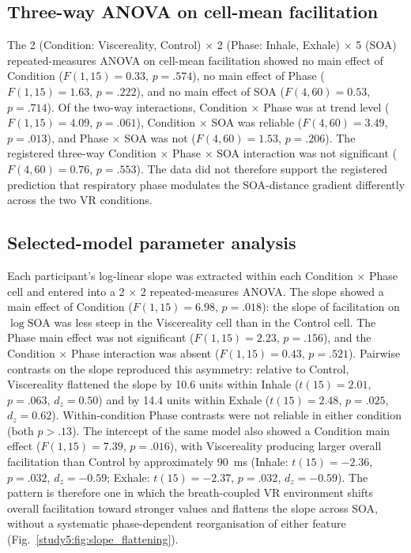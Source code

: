 \subsection{Three-way ANOVA on cell-mean facilitation}

The 2 (Condition: Viscereality, Control) $\times$ 2 (Phase: Inhale, Exhale) $\times$ 5 (SOA) repeated-measures ANOVA on cell-mean facilitation showed no main effect of Condition ($F(1,15) = 0.33$, $p = .574$), no main effect of Phase ($F(1,15) = 1.63$, $p = .222$), and no main effect of SOA ($F(4,60) = 0.53$, $p = .714$). Of the two-way interactions, Condition $\times$ Phase was at trend level ($F(1,15) = 4.09$, $p = .061$), Condition $\times$ SOA was reliable ($F(4,60) = 3.49$, $p = .013$), and Phase $\times$ SOA was not ($F(4,60) = 1.53$, $p = .206$). The registered three-way Condition $\times$ Phase $\times$ SOA interaction was not significant ($F(4,60) = 0.76$, $p = .553$). The data did not therefore support the registered prediction that respiratory phase modulates the SOA-distance gradient differently across the two VR conditions.

\subsection{Selected-model parameter analysis}

Each participant's log-linear slope was extracted within each Condition $\times$ Phase cell and entered into a 2 $\times$ 2 repeated-measures ANOVA. The slope showed a main effect of Condition ($F(1,15) = 6.98$, $p = .018$): the slope of facilitation on $\log\mathrm{SOA}$ was less steep in the Viscereality cell than in the Control cell. The Phase main effect was not significant ($F(1,15) = 2.23$, $p = .156$), and the Condition $\times$ Phase interaction was absent ($F(1,15) = 0.43$, $p = .521$). Pairwise contrasts on the slope reproduced this asymmetry: relative to Control, Viscereality flattened the slope by 10.6 units within Inhale ($t(15) = 2.01$, $p = .063$, $d_{z} = 0.50$) and by 14.4 units within Exhale ($t(15) = 2.48$, $p = .025$, $d_{z} = 0.62$). Within-condition Phase contrasts were not reliable in either condition (both $p > .13$). The intercept of the same model also showed a Condition main effect ($F(1,15) = 7.39$, $p = .016$), with Viscereality producing larger overall facilitation than Control by approximately 90~ms (Inhale: $t(15) = -2.36$, $p = .032$, $d_{z} = -0.59$; Exhale: $t(15) = -2.37$, $p = .032$, $d_{z} = -0.59$). The pattern is therefore one in which the breath-coupled VR environment shifts overall facilitation toward stronger values and flattens the slope across SOA, without a systematic phase-dependent reorganisation of either feature (Fig.~\ref{study5:fig:slope_flattening}).


